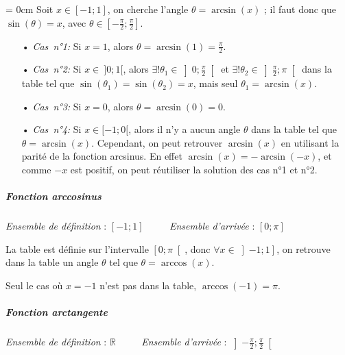 \documentclass[a4paper]{article}
\begin{document}
					\vspace{2 mm}

					{\parindent = 0cm Soit $x \in [-1;1]$, on cherche l'angle $\theta = \arcsin(x)$ ; il faut donc que $\sin(\theta) = x$, 
					avec $\theta \in \left[-\frac{\pi}{2};\frac{\pi}{2}\right]$.}

					\vspace{2 mm}
					
					\begin{itemize}
						\item [•] \emph{Cas~n°1:} Si $x = 1$, alors $\theta = \arcsin(1) = \frac{\pi}{2}$.
						\vspace{2 mm}
						\item [•] \emph{Cas~n°2:} Si $x \in ~ ]0;1[$, alors $\exists! \theta_1 \in \left]0;\frac{\pi}{2}\right[$ et $\exists! \theta_2 \in \left]\frac{\pi}{2};\pi\right[$ dans la table tel que $\sin(\theta_1) = \sin(\theta_2) = x$, mais seul \emph{$\theta_1 = \arcsin(x)$}.
						\vspace{2 mm}
						\item [•] \emph{Cas~n°3:} Si $x = 0$, alors $\theta = \arcsin(0) = 0$.
						\vspace{2 mm}
						\item [•] \emph{Cas~n°4:} Si $x \in [-1;0[$, alors il n'y a aucun angle $\theta$ dans la table tel que $\theta = \arcsin(x)$. Cependant, on peut retrouver $\arcsin(x)$ en utilisant la parité de la fonction arcsinus. En effet $\arcsin(x) = -\arcsin(-x)$, et comme $-x$ est positif, on peut réutiliser la solution des cas n°1 et n°2.
					\end{itemize}

				\vspace{-2 mm}

				\subparagraph*{Fonction arccosinus}
					\textit{Ensemble de définition} : $[-1;1]$ ~~~~	\textit{Ensemble d'arrivée} : $\left[0;\pi\right]$

					\vspace{2 mm}

					La table est définie sur l'intervalle $\left[0;\pi\right[$, donc $\forall x \in \left]-1;1\right]$, 
					on retrouve dans la table un angle $\theta$ tel que $\theta = \arccos(x)$.

					Seul le cas où $x = -1$ n'est pas dans la table, $\arccos(-1) = \pi$.


				\subparagraph*{Fonction arctangente}
					\textit{Ensemble de définition} : $\mathbb{R}$ ~~~~	\textit{Ensemble d'arrivée} : $\left]-\frac{\pi}{2};\frac{\pi}{2}\right[$
\end{document}
